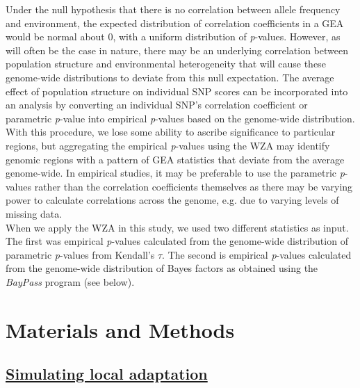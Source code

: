 \documentclass[10pt,twoside,lineno]{GSA_format}
\begin{document}
Under the null hypothesis that there is no correlation between allele frequency and environment, the expected distribution of correlation coefficients in a GEA would be normal about 0, with a uniform distribution of \textit{p}-values. However, as will often be the case in nature, there may be an underlying correlation between population structure and environmental heterogeneity that will cause these genome-wide distributions to deviate from this null expectation. The average effect of population structure on individual SNP scores can be incorporated into an analysis by converting an individual SNP's correlation coefficient or parametric \textit{p}-value into empirical \textit{p}-values based on the genome-wide distribution. With this procedure, we lose some ability to ascribe significance to particular regions, but aggregating the empirical \textit{p}-values using the WZA may identify genomic regions with a pattern of GEA statistics that deviate from the average genome-wide. In empirical studies, it may be preferable to use the parametric \textit{p}-values rather than the correlation coefficients themselves as there may be varying power to calculate correlations across the genome, e.g. due to varying levels of missing data. \\

When we apply the WZA in this study, we used two different statistics as input. The first was empirical \textit{p}-values calculated from the genome-wide distribution of parametric \textit{p}-values from Kendall's $\tau$. The second is empirical \textit{p}-values calculated from the genome-wide distribution of Bayes factors as obtained using the \textit{BayPass} program (see below). 


\section{Materials and Methods}
\label{sec:materials:methods}


\subsection{\underline{Simulating local adaptation}} 
\end{document}
